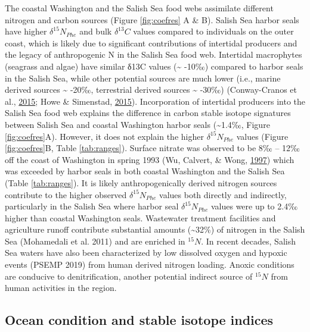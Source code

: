 \documentclass [11pt, proquest] {uwthesis}[2015/03/03]
\begin{document}
The coastal Washington and the Salish Sea food webs assimilate different
nitrogen and carbon sources (Figure \ref{fig:coefres} A \& B). Salish
Sea harbor seals have higher \(\delta^{15}N_{Phe}\) and bulk
\(\delta^{13}C\) values compared to individuals on the outer coast,
which is likely due to significant contributions of intertidal producers
and the legacy of anthropogenic N in the Salish Sea food web. Intertidal
macrophytes (seagrass and algae) have similar δ13C values
(\textasciitilde{} -10‰) compared to harbor seals in the Salish Sea,
while other potential sources are much lower (i.e., marine derived
sources \textasciitilde{} -20‰, terrestrial derived sources
\textasciitilde{} -30‰) (Conway-Cranos et al.,
\protect\hyperlink{ref-Conway2015}{2015}; Howe \& Simenstad,
\protect\hyperlink{ref-Howe2015}{2015}). Incorporation of intertidal
producers into the Salish Sea food web explains the difference in carbon
stable isotope signatures between Salish Sea and coastal Washington
harbor seals (\textasciitilde{}1.4‰, Figure \ref{fig:coefres}A).
However, it does not explain the higher \(\delta^{15}N_{Phe}\) values
(Figure \ref{fig:coefres}B, Table \ref{tab:ranges}). Surface nitrate was
observed to be 8‰ -- 12‰ off the coast of Washington in spring 1993 (Wu,
Calvert, \& Wong, \protect\hyperlink{ref-Wu1997}{1997}) which was
exceeded by harbor seals in both coastal Washington and the Salish Sea
(Table \ref{tab:ranges}). It is likely anthropogenically derived
nitrogen sources contribute to the higher observed
\(\delta^{15}N_{Phe}\) values both directly and indirectly, particularly
in the Salish Sea where harbor seal \(\delta^{15}N_{Phe}\) values were
up to 2.4‰ higher than coastal Washington seals. Wastewater treatment
facilities and agriculture runoff contribute substantial amounts
(\textasciitilde{}32\%) of nitrogen in the Salish Sea (Mohamedali et al.
2011) and are enriched in \(^{15}N\). In recent decades, Salish Sea
waters have also been characterized by low dissolved oxygen and hypoxic
events (PSEMP 2019) from human derived nitrogen loading. Anoxic
conditions are conducive to denitrification, another potential indirect
source of \(^{15}N\) from human activities in the region.

\subsection{Ocean condition and stable isotope
indices}\label{ocean-condition-and-stable-isotope-indices}
\end{document}
